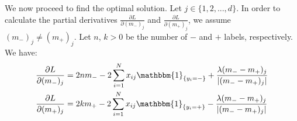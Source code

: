 \documentclass [a4paper] {report}
\begin{document}
	\noindent
	We now proceed to find the optimal solution. Let $j \in \{1,2, ..., d \}$. In order to calculate the partial derivatives $\frac{\partial L}{\partial(m_{-})_{j}}$ and $\frac{\partial L}{\partial(m_{+})_{j}}$, we assume $(m_{-})_{j} \neq (m_{+})_{j}$. Let $n$, $k>0$ be the number of $-$ and $+$ labels, respectively. We have:
	\begin{equation}
		\begin{split}
			\frac{\partial L}{\partial(m_{-})_{j}} &= 2n m_{-} - 2 \sum_{i=1}^{N} x_{ij} \mathbbm{1}_{\{y_{i}=-\}} + \frac{\lambda (m_{-} - m_{+})_{j}}{|(m_{-} - m_{+})_{j}|}\\
			\frac{\partial L}{\partial(m_{+})_{j}} &= 2k m_{+} - 2 \sum_{i=1}^{N} x_{ij} \mathbbm{1}_{\{y_{i}=+\}} - \frac{\lambda (m_{-} - m_{+})_{j}}{|(m_{-} - m_{+})_{j}|}\\
		\end{split}		
	\end{equation}
	
\end{document}
